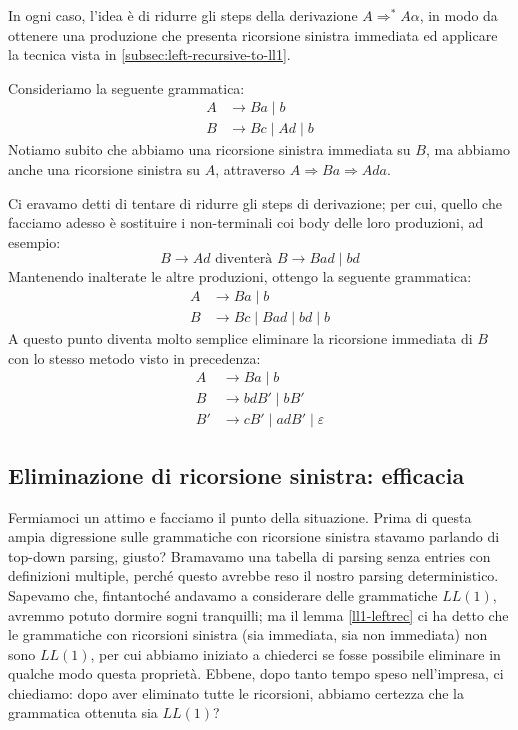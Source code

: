 \documentclass[class=book, crop=false, oneside, 12pt]{standalone}
\begin{document}
In ogni caso, l'idea è di ridurre gli steps della derivazione \(A \Rightarrow^* A \alpha\), in modo da ottenere una produzione che presenta ricorsione sinistra immediata ed applicare la tecnica vista in \ref{subsec:left-recursive-to-ll1}.

Consideriamo la seguente grammatica:
\begin{align*}
    A &\to Ba \mid b \\
    B &\to Bc \mid Ad \mid b
\end{align*}
Notiamo subito che abbiamo una ricorsione sinistra immediata su \(B\),  ma abbiamo anche una ricorsione sinistra su \(A\), attraverso \(A \Rightarrow Ba \Rightarrow Ada\).

Ci eravamo detti di tentare di ridurre gli steps di derivazione; per cui, quello che facciamo adesso è sostituire i non-terminali coi body delle loro produzioni, ad esempio:
\begin{equation*}
    B \to Ad \textrm{ diventerà } B \to Bad \mid bd
\end{equation*}
Mantenendo inalterate le altre produzioni, ottengo la seguente grammatica:
\begin{align*}
    A &\to Ba \mid b \\
    B &\to Bc \mid Bad \mid bd \mid b
\end{align*}
A questo punto diventa molto semplice eliminare la ricorsione immediata di \(B\) con lo stesso metodo visto in precedenza:
\begin{align*}
    A &\to Ba \mid b \\
    B &\to bdB' \mid bB' \\
    B' &\to cB' \mid adB' \mid \varepsilon
\end{align*}

\subsection{Eliminazione di ricorsione sinistra: efficacia}
Fermiamoci un attimo e facciamo il punto della situazione. Prima di questa ampia digressione sulle grammatiche con ricorsione sinistra stavamo parlando di top-down parsing, giusto? Bramavamo una tabella di parsing senza entries con definizioni multiple, perché questo avrebbe reso il nostro parsing deterministico. Sapevamo che, fintantoché andavamo a considerare delle grammatiche \(LL(1)\), avremmo potuto dormire sogni tranquilli; ma il lemma \ref{ll1-leftrec} ci ha detto che le grammatiche con ricorsioni sinistra (sia immediata, sia non immediata) non sono \(LL(1)\), per cui abbiamo iniziato a chiederci se fosse possibile eliminare in qualche modo questa proprietà. Ebbene, dopo tanto tempo speso nell'impresa, ci chiediamo: dopo aver eliminato tutte le ricorsioni, abbiamo certezza che la grammatica ottenuta sia \(LL(1)\)?
\end{document}
